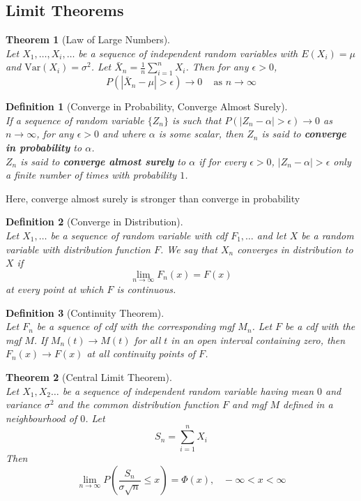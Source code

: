 \documentclass[12pt]{article}
\newcommand{\var}{\mathrm{Var}}
\newtheorem{definition}{Definition}[section]
\newtheorem{theorem}{Theorem}[section]
\theoremstyle{definition}
\begin{document}
\subsection{Limit Theorems}
\begin{theorem}[Law of Large Numbers]
\hfill\\\normalfont Let $X_1,\ldots, X_i,\ldots$ be a sequence of independent random variables with $E(X_i)=\mu$ and $\var(X_i)=\sigma^2$. Let $\bar{X}_n = \frac{1}{n}\sum_{i=1}^n X_i$. Then for any $\epsilon>0$,
\[
P(|\bar{X}_n-\mu|>\epsilon)\to 0\;\;\;\text{ as }n\to \infty
\]
\end{theorem}
\begin{definition}[Converge in Probability, Converge Almost Surely]
\hfill\\\normalfont If a sequence of random variable $\{Z_n\}$ is such that $P(|Z_n-\alpha|>\epsilon)\to 0$ as $n\to \infty$, for any $\epsilon>0$ and where $\alpha$ is some scalar, then $Z_n$ is said to \textbf{converge in probability} to $\alpha$.\\

$Z_n$ is said to \textbf{converge almost surely} to $\alpha$ if for every $\epsilon>0$, $|Z_n-\alpha|>\epsilon$ only a finite number of times with probability $1$.
\end{definition}
Here, converge almost surely is stronger than converge in probability
\begin{definition}[Converge in Distribution]
\hfill\\\normalfont Let $X_1,\ldots$ be a sequence of random variable with cdf $F_1,\ldots$ and let $X$ be a random variable with distribution function $F$. We say that $X_n$ converges in distribution to $X$ if
\[
\lim_{n\to \infty} F_n(x) = F(x)
\]
at every point at which $F$ is continuous.
\end{definition}
\begin{definition}[Continuity Theorem]
\hfill\\\normalfont Let $F_n$ be a squence of cdf with the corresponding mgf $M_n$. Let $F$ be a cdf with the mgf $M$. If $M_n(t)\to M(t)$ for all $t$ in an open interval containing zero, then $F_n(x)\to F(x)$ at all continuity points of $F$.
\end{definition}
\begin{theorem}[Central Limit Theorem]
\hfill\\\normalfont Let $X_1, X_2\ldots$ be a sequence of independent random variable having mean $0$ and variance $\sigma^2$ and the common distribution function $F$ and mgf $M$ defined in a neighbourhood of $0$. Let
\[
S_n = \sum_{i=1}^n X_i
\]
Then
\[
\lim_{n\to \infty} P(\frac{S_n}{\sigma \sqrt{n}}\leq x)=\Phi(x),\;\;\;-\infty<x<\infty
\]
\end{theorem}
\clearpage
\end{document}
